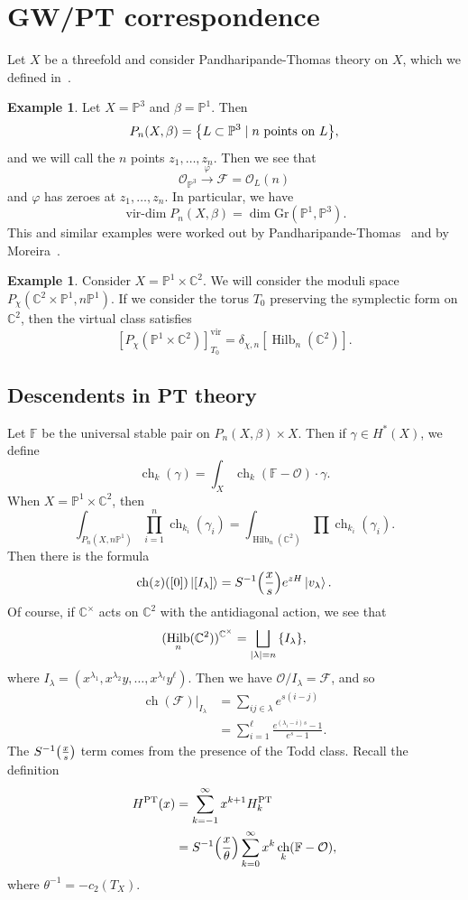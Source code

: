 \documentclass[leqno, openany]{memoir}
\theoremstyle{definition}
\newtheorem{exm}[thm]{Example}
\theoremstyle{remark}
\theoremstyle{plain}
\theoremstyle{definition}
\theoremstyle{remark}
\newcommand{\F}{\mathbb{F}}
\newcommand{\C}{\mathbb{C}}
\renewcommand{\P}{\mathbb{P}}
\newcommand{\mc}[1]{\mathcal{#1}}
\newcommand{\mr}[1]{\mathrm{#1}}
\newcommand{\on}[1]{\operatorname{#1}}
\DeclareMathOperator{\ch}{ch}
\DeclareMathOperator{\Hilb}{Hilb}
\begin{document}
\section{GW/PT correspondence}

Let $X$ be a threefold and consider Pandharipande-Thomas theory on $X$, which we defined in~.

\begin{exm}
    Let $X = \P^3$ and $\beta = \P^1$. Then
    \[ P_n(X, \beta) = \qty{L \subset \P^3 \mid n \text{ points on }L}, \]
    and we will call the $n$ points $z_1, \ldots, z_n$. Then we see that
    \[ \mc{O}_{\P^3} \xrightarrow{\varphi} \mc{F} = \mc{O}_L(n) \]
    and $\varphi$ has zeroes at $z_1, \ldots, z_n$. In particular, we have
    \[ \on{vir-dim} P_n(X, \beta) = \dim \mr{Gr}(\P^1, \P^3). \]
    This and similar examples were worked out by Pandharipande-Thomas~\cite{ptthy} and by Moreira~\cite{moreira}.
\end{exm}

\begin{exm}
    Consider $X = \P^1 \times \C^2$. We will consider the moduli space $P_{\chi}(\C^2 \times \P^1, n \P^1)$. If we consider the torus $T_0$ preserving the symplectic form on $\C^2$, then the virtual class satisfies
    \[ [P_{\chi}(\P^1 \times \C^2)]^{\mr{vir}}_{T_0} = \delta_{\chi, n}[\Hilb_n(\C^2)]. \]
\end{exm}

\subsection{Descendents in PT theory}

Let $\F$ be the universal stable pair on $P_n(X, \beta) \times X$. Then if $\gamma \in H^*(X)$, we define
\[ \ch_k(\gamma) = \int_X \ch_k(\F - \mc{O}) \cdot \gamma. \]
When $X = \P^1 \times \C^2$, then 
\[ \int_{P_n(X, n \P^1)} \prod_{i=1}^n \ch_{k_i}(\gamma_i) = \int_{\Hilb_n(\C^2)} \prod \ch_{k_i}(\gamma_i). \]
Then there is the formula
\[ \ch(z)([0]) \ket{[I_{\lambda}]} = S^{-1} \qty(\frac{x}{s})e^{zH} \ket{v_{\lambda}}. \]
Of course, if $\C^{\times}$ acts on $\C^2$ with the antidiagonal action, we see that
\[ (\Hilb_n(\C^2))^{\C^{\times}} = \bigsqcup_{\abs{\lambda} = n} \qty{I_{\lambda}}, \]
where $I_{\lambda} = (x^{\lambda_1}, x^{\lambda_2}y, \ldots, x^{\lambda_{\ell}} y^{\ell})$. Then we have $\mc{O} / I_{\lambda} = \mc{F}$, and so
\begin{align*} 
    \ch(\mc{F}) |_{I_{\lambda}} &= \sum_{ij \in \lambda} e^{s(i-j)} \\ 
    &= \sum_{i=1}^{\ell} \frac{e^{(\lambda_i - i)s}-1}{e^s-1}.
\end{align*}
The $S^{-1}\qty(\frac{x}{s})$ term comes from the presence of the Todd class. Recall the definition
\begin{align*}
    H^{\mr{PT}}(x) &= \sum_{k=-1}^{\infty} x^{k+1} H_k^{\mr{PT}} \\
    &= S^{-1}\qty(\frac{x}{\theta}) \sum_{k=0}^{\infty} x^k \ch_k(\F-\mc{O}),
\end{align*}
where $\theta^{-1} = -c_2(T_X)$.
\end{document}
